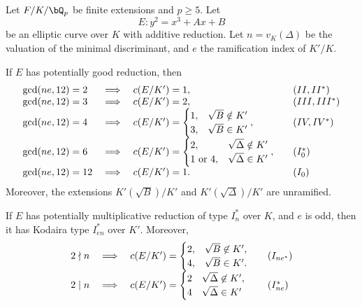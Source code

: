 \begin{lemma}
    Let $F /K / \bQ_p$ be finite extensions and $p \geq 5$. Let 
    $$E:  y^2 = x^3 + Ax + B$$
    be an elliptic curve over $K$ with additive reduction. Let $n=v_K(\Delta)$ be the valuation of the minimal discriminant, and $e$ the ramification index of $K'/K$.

    If $E$ has potentially good reduction, then 
        \[
        \begin{array}{l l l l}
            \gcd(ne, 12) = 2 & \implies & c(E / K') = 1, & \quad (II, II^*) \\
            \gcd(ne, 12) = 3 & \implies & c(E / K') = 2, & \quad (III, III^*) \\
            \gcd(ne, 12) = 4 & \implies & c(E / K') = \begin{cases} 1, & \sqrt{B} \notin K'
                                \\ 3, & \sqrt{B} \in K' \end{cases}, & \quad (IV, IV^*) \\
            \gcd(ne, 12) = 6 & \implies & c(E / K') = \begin{cases} 2, & \sqrt{\Delta} \notin K'
                \\ 1 \ \text{or} \ 4, & \sqrt{\Delta} \in K' \end{cases}, & \quad (I_0^*) \\
            \gcd(ne, 12) = 12 & \implies & c(E / K') = 1. & \quad (I_0)
        \end{array}
        \]
    Moreover, the extensions $K'(\sqrt{B}) / K'$ and $K'(\sqrt{\Delta}) / K'$ are unramified.

    If $E$ has potentially multiplicative reduction of type $I_n^*$ over $K$, and $e$ is odd, then it has Kodaira type $I_{en}^*$ over $K'$. Moreover, 
    \[
        \begin{array}{l l l l}
        2 \nmid n & \implies & c(E / K') = \begin{cases} 2, & \sqrt{B} \not\in K', \\ 4, & \sqrt{B} \in K'. \end{cases} & \quad (I_{ne^*}) \\
        2 \mid n & \implies & c(E / K') = \begin{cases} 2 & \sqrt{\Delta} \not\in K', \\ 4 & \sqrt{\Delta} \in K' \end{cases} & \quad ({I_{ne}^*})   
        \end{array} 
    \]
\end{lemma}

